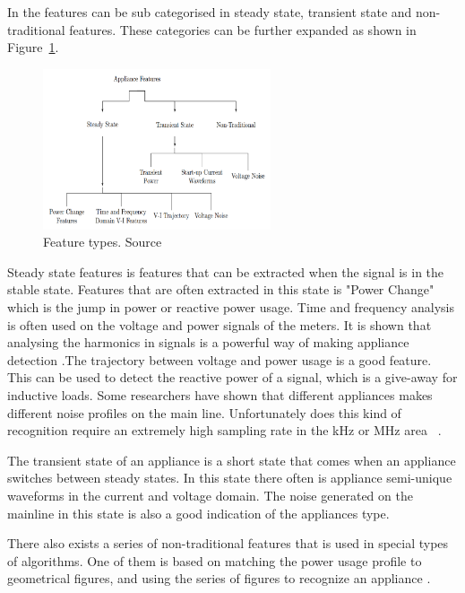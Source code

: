 In  the features can be sub categorised in steady state, transient state and non-traditional features.  These categories can be further expanded as shown in Figure~\ref{fig:FTR}. 

\begin{figure}[H]
\centering
\includegraphics[width=0.6\textwidth]{billeder/featureOverview.png}
\caption[Feature types.]{Feature types. Source \citep{RefWorks:17}}
\label{fig:FTR}
\end{figure}

Steady state features is features that can be extracted when the signal is in the stable state. Features that are often extracted in this state is "Power Change" which is the jump in power or reactive power usage. Time and frequency analysis is often used on the voltage and power signals of the meters. It is shown that analysing the harmonics in signals is a powerful way of making appliance detection \citep{RefWorks:29}.The trajectory between voltage and power usage is a good feature. This can be used to detect the reactive power of a signal, which is a give-away for inductive loads. Some researchers have shown that different appliances makes different noise profiles on the main line. Unfortunately does this kind of recognition require an extremely high sampling rate in the kHz or MHz area~ \citep{RefWorks:30}. 

The transient state of an appliance is a short state that comes when an appliance switches between steady states. In this state there often is appliance semi-unique waveforms in the current and voltage domain. The noise generated on the mainline in this state is also a good indication of the appliances type. 

There also exists a series of non-traditional features that is used in special types of algorithms. One of them is based on matching the power usage profile to geometrical figures, and using the series of figures to recognize an appliance \citep{RefWorks:17}.  

